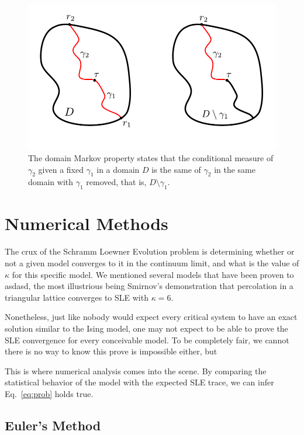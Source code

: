 \begin{figure}
\begin{center}
    \includegraphics[scale=0.9]{chapters/ch4-sle/figs/dmp}
\end{center}
\caption{The domain Markov property states that the conditional measure of
    $\gamma_2$ given a fixed $\gamma_1$ in a domain $D$ is the same of $\gamma_2$
    in the same domain with $\gamma_1$ removed, that is, $D\setminus\gamma_1$.}
\label{fig:dmp}
\end{figure}


\section{Numerical Methods}
\label{sec:num}

The crux of the Schramm Loewner Evolution problem is determining whether or not
a given model converges to it in the continuum limit, and what is the value of
$\kappa$ for this specific model. We mentioned several models that have been
proven to asdasd, the most illustrious being Smirnov's demonstration that
percolation in a triangular lattice converges to SLE with $\kappa=6$.

Nonetheless, just like nobody would expect every critical system to have an
exact solution similar to the Ising model, one may not expect to be able to
prove the SLE convergence for every conceivable model. To be completely
fair, we cannot there is no way to know this prove is impossible either, but

This is where
numerical analysis comes into the scene. By comparing the statistical behavior
of the model with the expected SLE trace, we can infer Eq.~\ref{eq:prob} holds
true.

\subsection{Euler's Method}
\label{ss:euler}

